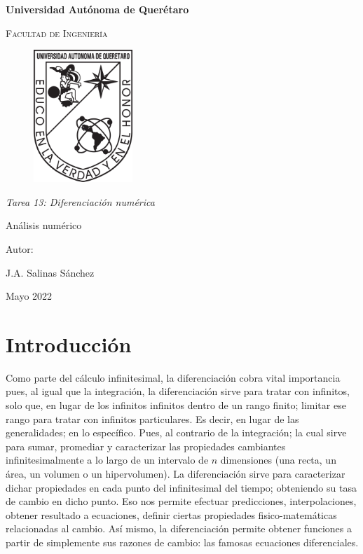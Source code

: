 \documentclass[12pt,oneside,FLEQN]{report}
\begin{document}
{
\selectfont
	\BgThispage
\begin{titlepage}
        \topmargin=1cm
        \centering

        {\bfseries\LARGE Universidad Autónoma de Querétaro \par}
        \vspace{1cm}
        {\scshape\Large  Facultad de Ingenier\'ia  \par}
        \vspace{3cm}
        \begin{figure}[!h]
        	\centering
                \includegraphics[height=5cm]{Logouaq.png}
        \end{figure}
        \vspace{2cm}
        {\itshape\large Tarea 13: Diferenciación numérica\par}
        \vspace{3cm}
        {\Huge Análisis numérico\par}
        \vspace{2cm}
        {\Large Autor: \par}
        {\large J.A. Salinas Sánchez \par}
        {\large Mayo 2022 \par}
\end{titlepage}
	\clearpage
	\newpage
\tableofcontents
\chapter{Introducción}
Como parte del cálculo infinitesimal,  la diferenciación cobra vital importancia pues, al igual que la integración, la diferenciación sirve para tratar con infinitos, solo que, en lugar de los infinitos infinitos dentro de un rango finito; limitar ese rango para tratar con infinitos particulares. Es decir, en lugar de las generalidades; en lo específico. Pues, al contrario de la integración; la cual sirve para sumar, promediar y caracterizar las propiedades cambiantes infinitesimalmente a lo largo de un intervalo de $n$ dimensiones (una recta, un área, un volumen o un hipervolumen). La diferenciación sirve para caracterizar dichar propiedades en cada punto del infinitesimal del tiempo; obteniendo su tasa de cambio en dicho punto. Eso nos permite efectuar predicciones, interpolaciones, obtener resultado a ecuaciones, definir ciertas propiedades fisico-matemáticas relacionadas al cambio. Así mismo, la diferenciación permite obtener funciones a partir de simplemente sus razones de cambio: las famosas ecuaciones diferenciales.\\

}
\end{document}

